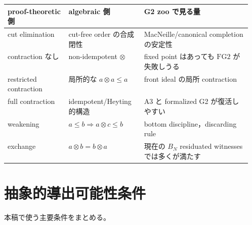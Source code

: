 ﻿\documentclass[a4paper,10pt]{ltjsarticle}
\newcommand{\FGtwo}{\mathrm{FG2}}
\begin{document}
\begin{center}
\begin{tabularx}{\linewidth}{>{\raggedright\arraybackslash}p{0.25\linewidth}
>{\raggedright\arraybackslash}p{0.31\linewidth}
>{\raggedright\arraybackslash}X}
\toprule
proof-theoretic 側 & algebraic 側 & G2 zoo で見る量 \\
\midrule
cut elimination & cut-free order の合成閉性 & MacNeille/canonical completion の安定性 \\
contraction なし & non-idempotent \(\otimes\) & fixed point はあっても \(\FGtwo\) が失敗しうる \\
restricted contraction & 局所的な \(a\otimes a\le a\) & front ideal の局所 contraction \\
full contraction & idempotent/Heyting 的構造 & A3 と formalized G2 が復活しやすい \\
weakening & \(a\le b\Rightarrow a\otimes c\le b\) & bottom discipline，discarding rule \\
exchange & \(a\otimes b=b\otimes a\) & 現在の \(B_N\) residuated witnesses では多くが満たす \\
\bottomrule
\end{tabularx}
\end{center}

\section{抽象的導出可能性条件}

本稿で使う主要条件をまとめる。
\end{document}
